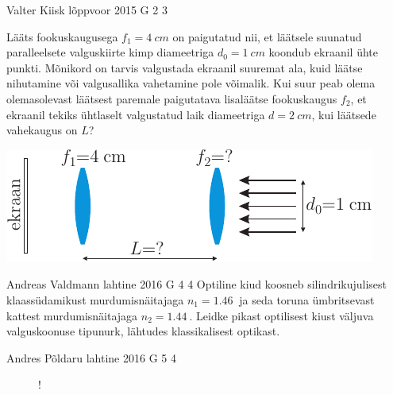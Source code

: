 \documentclass[11pt]{article}
\begin{document}
{%
{Valter Kiisk} %
{lõppvoor} %
{2015} %
{G 2} %
{3} %
{
\ifStatement
Lääts fookuskaugusega $f_1=\SI{4}{cm}$ on paigutatud nii, et läätsele suunatud paralleelsete valguskiirte kimp diameetriga $d_0=\SI{1}{cm}$ koondub ekraanil ühte punkti. Mõnikord on tarvis valgustada ekraanil suuremat ala, kuid läätse nihutamine või valgusallika vahetamine pole võimalik. Kui suur peab olema olemasolevast läätsest paremale paigutatava lisaläätse fookuskaugus $f_2$, et ekraanil tekiks ühtlaselt valgustatud laik diameetriga $d=\SI{2}{cm}$, kui läätsede vahekaugus on $L$?
\begin{center}
\includegraphics[scale=1.5]{2015-v3g-02-valgustamine-yles}
\end{center}
\fi
}

{Andreas Valdmann} %
{lahtine} %
{2016} %
{G 4} %
{4} %
{
\ifStatement
Optiline kiud koosneb silindrikujulisest klaassüdamikust murdumisnäitajaga $n_1=\SI{1,46}{}$ ja seda toruna ümbritsevast kattest murdumisnäitajaga $n_2=\SI{1,44}{}$. Leidke pikast optilisest kiust väljuva valguskoonuse tipunurk, lähtudes klassikalisest optikast.
\fi
}

{Andres Põldaru} %
{lahtine} %
{2016} %
{G 5} %
{4} %
{
\ifStatement
\begin{figure}
	\vspace{-20pt}
	\begin{resizebox}{0.6\textwidth}{!}{
}
	\end{resizebox}
\end{figure}

}}
\end{document}
